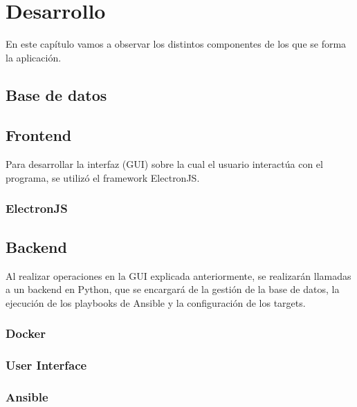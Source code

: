 \chapter{Desarrollo}
\label{ch:desarrollo}
En este capítulo vamos a observar los distintos componentes de los que se forma la aplicación. 
\section{Base de datos}


\section{Frontend}
Para desarrollar la interfaz (GUI) sobre la cual el usuario interactúa con el programa, se utilizó el framework ElectronJS\cite{ElectronJS}. 

\subsection{ElectronJS}


% 

\section{Backend}
Al realizar operaciones en la GUI explicada anteriormente, se realizarán llamadas a un backend en Python, que se encargará de la gestión de la base de datos, la ejecución de los playbooks de Ansible y la configuración de los targets.
\subsection{Docker}


\subsection{User Interface}
% 

\subsection{Ansible}


